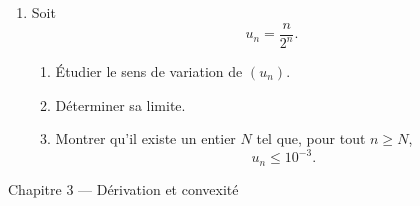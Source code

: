 \documentclass[11pt,a4paper]{article}
\begin{document}
\begin{enumerate}[label=\textbf{Exercice \arabic*.}, start=1, leftmargin=*, itemsep=1em]
\item Soit
\[
u_n=\frac{n}{2^n}.
\]

\begin{enumerate}[label=\alph*)]
    \item Étudier le sens de variation de \((u_n)\).
    \item Déterminer sa limite.
    \item Montrer qu'il existe un entier \(N\) tel que, pour tout \(n\geq N\),
    \[
    u_n\leq 10^{-3}.
    \]
\end{enumerate}

\end{enumerate}

\begin{chapitrebox}{Chapitre 3 --- Dérivation et convexité}
\end{chapitrebox}
\end{document}
